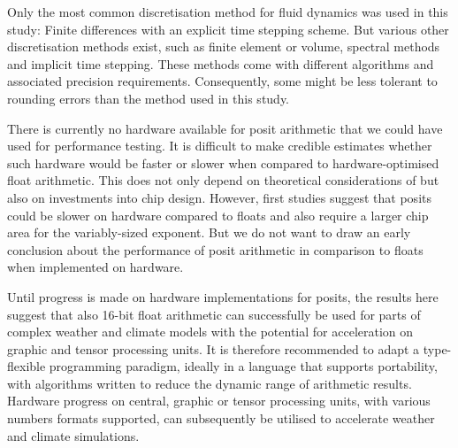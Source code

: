 Only the most common discretisation method for fluid dynamics was used in this study: Finite differences with an explicit time
stepping scheme. But various other discretisation methods exist, such as finite element or volume, spectral methods and
implicit time stepping. These methods come with different algorithms and associated precision requirements. Consequently,
some might be less tolerant to rounding errors than the method used in this study.

There is currently no hardware available for posit arithmetic that we could have used for performance testing. It is difficult
to make credible estimates whether such hardware would be faster or slower when compared to hardware-optimised
float arithmetic. This does not only depend on theoretical considerations of but also on investments into chip design.
However, first studies suggest that posits could be slower on hardware compared to floats \citep{deDinechin2019,Uguen2019,Forget2021}
and also require a larger chip area for the variably-sized exponent. But we do not want to draw an early conclusion about the performance
of posit arithmetic in comparison to floats when implemented on hardware.

Until progress is made on hardware implementations for posits, the results here suggest that also 16-bit float arithmetic can
successfully be used for parts of complex weather and climate models with the potential for acceleration on graphic and tensor
processing units. It is therefore recommended to adapt a type-flexible programming paradigm, ideally in a language that supports
portability, with algorithms written to reduce the dynamic range of arithmetic results. Hardware progress on central, graphic or
tensor processing units, with various numbers formats supported, can subsequently be utilised to accelerate weather and
climate simulations.
